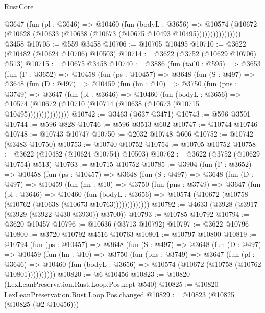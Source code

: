\begin{lexlean}{RustCore}
\begin{coremodule}
                  @3647
                    (fun (pl : @3646) =>
                    @10460
                      (fun (bodyL : @3656) =>
                      @10574
                        (@10672
                          (@10628 (@10633 (@10638 (@10673 (@10675 @10493 @10495))))))))))))))))
    @3458
@10705 := @559 @3458
@10706 := @10705 @10495
@10710 := @3622 (@10482 (@10624 @10706) @10503)
@10714 := @3622 (@3752 (@10629 @10706) @513)
@10715 := @10675 @3458
@10740 := @3886
    (fun (tail0 : @595) =>
    @3653
      (fun (Γ : @3652) =>
      @10458
        (fun (ps : @10457) =>
        @3648
          (fun (S : @497) =>
          @3648
            (fun (D : @497) =>
            @10459
              (fun (hn : @10) =>
              @3750
                (fun (pns : @3749) =>
                @3647
                  (fun (pl : @3646) =>
                  @10460
                    (fun (bodyL : @3656) =>
                    @10574 (@10672 (@10710 (@10714 (@10638 (@10673 (@10715 @10495)))))))))))))))
@10742 := @3463 (@637 @3471)
@10743 := @596 @3501
@10744 := @596 @828
@10746 := @596 @3513 @602
@10747 := @10744 @10746
@10748 := @10743 @10747
@10750 := @2032 @10748 @606
@10752 := @10742 (@3483 @10750)
@10753 := @10740 @10752
@10754 := @10705 @10752
@10758 := @3622 (@10482 (@10624 @10754) @10503)
@10762 := @3622 (@3752 (@10629 @10754) @513)
@10763 := @10715 @10752
@10785 := @3904
    (fun (Γ : @3652) =>
    @10458
      (fun (ps : @10457) =>
      @3648
        (fun (S : @497) =>
        @3648
          (fun (D : @497) =>
          @10459
            (fun (hn : @10) =>
            @3750
              (fun (pns : @3749) =>
              @3647
                (fun (pl : @3646) =>
                @10460
                  (fun (bodyL : @3656) =>
                  @10574 (@10672 (@10758 (@10762 (@10638 (@10673 @10763)))))))))))))
@10792 := @4633 (@3928 (@3917 (@3929 (@3922 @430 @3930)) @3700))
@10793 := @10785 @10792
@10794 := @3620 @10457
@10796 := @10636 (@3713 @10792)
@10797 := @3622 @10796
@10800 := @3720 @10792 @4516 @10763
@10801 := @10797 @10800
@10819 := @10794
    (fun (ps : @10457) =>
    @3648
      (fun (S : @497) =>
      @3648
        (fun (D : @497) =>
        @10459
          (fun (hn : @10) =>
          @3750
            (fun (pns : @3749) =>
            @3647
              (fun (pl : @3646) =>
              @10460 (fun (bodyL : @3656) => @10574 (@10672 (@10758 (@10762 @10801))))))))))
@10820 := @6 @10456
@10823 := @10820 (LexLeanPreservation.Rust.Loop.Pos.kept @540)
@10825 := @10820 LexLeanPreservation.Rust.Loop.Pos.changed
@10829 := @10823 (@10825 (@10825 (@2 @10456)))

\end{coremodule}
\end{lexlean}
